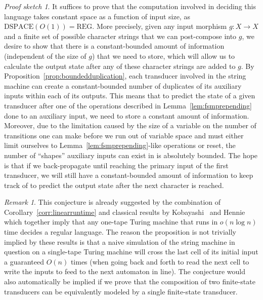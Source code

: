 \documentclass{article}
\theoremstyle{definition}
\theoremstyle{remark}
\newtheorem*{remark}{Remark}
\newtheorem*{proofsketch}{Proof sketch}
\begin{document}
\begin{proofsketch}
It suffices to prove that the computation involved in deciding
this language takes constant space as a function of input size,
as $\mathrm{DSPACE}(O(1))=\mathrm{REG}$. More precisely, given
any input morphism $g:X\to X$ and a finite set of
possible character strings that
we can post-compose into $g$, we
desire to show that there is a constant-bounded amount of information
(independent of the size of $g$) that
we need to store, which will allow us to calculate the output state after
any of these character strings are added to $g$.
By Proposition~\ref{prop:boundedduplication}, each transducer
involved in the string machine can create a constant-bounded
number of duplicates of its auxiliary inputs within each of
its outputs. This means that to predict the state of a given
transducer after one of the operations described in
Lemma~\ref{lem:fsmprepending} done to an auxiliary input,
we need to store a constant amount of information. Moreover, due to the limitation
caused by the size of a variable on the number of transitions one
can make before we run out of variable space and must either limit
ourselves to Lemma~\ref{lem:fsmprepending}-like operations or
reset, the number of ``shapes'' auxiliary inputs can exist in
is absolutely bounded. The hope is that if we back-propagate until
reaching the primary input of the first transducer, we will still
have a constant-bounded amount of information to keep track of to
predict the output state after the next character is reached.
\end{proofsketch}
\begin{remark}
    This conjecture is already
    suggested by the combination of Corollary~\ref{corr:linearruntime}
    and classical results by Kobayashi~\cite{kobayashi1985onetape}
    and Hennie~\cite{hennie1965onetape} which together imply that
    any one-tape Turing machine that runs in $o(n\log n)$ time decides
    a regular language. The reason
    the proposition is not trivially implied by
    these results is that a naive simulation of the string machine
    in question on a single-tape Turing machine will cross the last cell
    of its initial input a guaranteed $O(n)$ times (when going back and
    forth to read the next cell to write the inputs to feed to the next
    automaton in line). The conjecture would also automatically
    be implied if we prove that the composition of two finite-state
    transducers can be equivalently modeled by a single finite-state
    transducer.
\end{remark}
\end{document}
